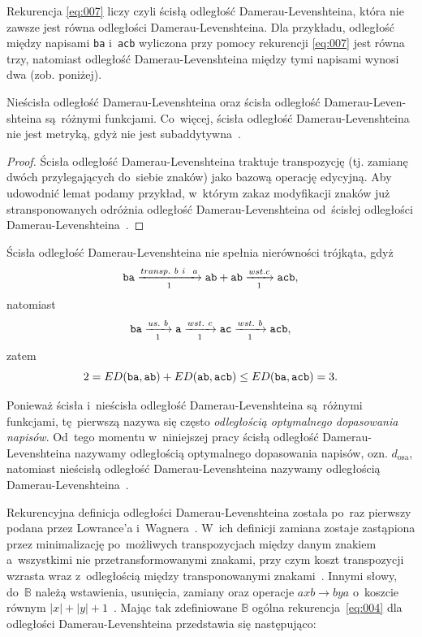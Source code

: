 \documentclass{praca1}
\begin{document}
Rekurencja \eqref{eq:007} liczy czyli ścisłą odległość Damerau-Levenshteina, która nie zawsze jest równa odległości Damerau-Levenshteina. Dla przykładu, odległość między napisami \verb|ba| i~\verb|acb| wyliczona przy pomocy rekurencji \eqref{eq:007} jest równa trzy, natomiast odległość Damerau-Levenshteina między tymi napisami wynosi dwa (zob. poniżej).

\begin{lemma}
Nieścisła odległość Damerau-Levenshteina oraz ścisła odległość \hbox{Damerau-Leven-} shteina są~różnymi funkcjami. Co~więcej, ścisła odległość Damerau-Levenshteina nie jest metryką, gdyż nie jest subaddytywna~\cite{Boytsov2011:indexingmethods}.
\end{lemma}

\begin{proof}
Ścisła odległość Damerau-Levenshteina traktuje transpozycję (tj. zamianę dwóch przylegających do~siebie znaków) jako bazową operację edycyjną. Aby udowodnić lemat podamy przykład, w~którym zakaz modyfikacji znaków już stransponowanych odróżnia odległość Damerau-Levenshteina od~ścisłej odległości Damerau-Levenshteina~\cite{Boytsov2011:indexingmethods}.
\end{proof}

Ścisła odległość Damerau-Levenshteina nie spełnia nierówności trójkąta, gdyż
$$
\verb|ba|  \xrightarrow[1]{transp.\ b\ i~\ a} \verb|ab| + \verb|ab| \xrightarrow[1]{wst. c} \verb|acb|,
$$
natomiast
$$
\verb|ba|  \xrightarrow[1]{us.\ b} \verb|a| \xrightarrow[1]{wst.\ c} \verb|ac| \xrightarrow[1]{wst.\ b} \verb|acb|,
$$
zatem
$$
2 = ED(\verb|ba|, \verb|ab|) + ED(\verb|ab|, \verb|acb|) \leq ED(\verb|ba|, \verb|acb|) = 3.
$$

Ponieważ ścisła i~nieścisła odległość Damerau-Levenshteina są~różnymi funkcjami, tę~pierwszą nazywa się często \emph{odległością optymalnego dopasowania napisów}. Od~tego momentu w~niniejszej pracy ścisłą odległość Damerau-Levenshteina nazywamy odległością optymalnego dopasowania napisów, ozn. $d_{\mathrm{osa}}$, natomiast nieścisłą odległość Damerau-Levenshteina nazywamy odległością Damerau-Levenshteina~\cite{Loo2014:stringdist}.

Rekurencyjna definicja odległości Damerau-Levenshteina została po~raz pierwszy podana przez Lowrance'a i~Wagnera~\cite{Wagner1975:extensionstring}. W~ich definicji zamiana zostaje zastąpiona przez minimalizację po~możliwych transpozycjach między danym znakiem a~wszystkimi nie przetransformowanymi znakami, przy czym koszt transpozycji wzrasta wraz z~odległością między transponowanymi znakami~\cite{Loo2014:stringdist}. Innymi słowy, do~$\mathbb{B}$ należą wstawienia, usunięcia, zamiany oraz operacje $axb \rightarrow bya$ o~koszcie równym $|x| + |y| + 1$~\cite{Boytsov2011:indexingmethods}. Mając tak zdefiniowane $\mathbb{B}$ ogólna rekurencja~\eqref{eq:004} dla odległości Damerau-Levenshteina przedstawia się następująco: 
\end{document}
